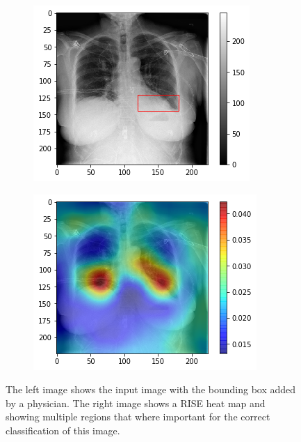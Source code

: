 \begin{figure}[H]
    \centering
    \begin{subfigure}[t]{.4\textwidth}
        \centering
        \includegraphics[width=\linewidth]{chapters/03_classification/images/rise1_bbox.png}
        \caption{}
    \end{subfigure}\hspace{1cm}%
    \begin{subfigure}[t]{.4\textwidth}
        \centering
        \includegraphics[width=\linewidth]{chapters/03_classification/images/rise1_saliency.png}
        \caption{}
    \end{subfigure}
    \caption{The left image shows the input image with the bounding box added by a physician. The right image shows a RISE heat map and showing multiple regions that where important for the correct classification of this image.}
    \label{rise_example_2}
\end{figure}

